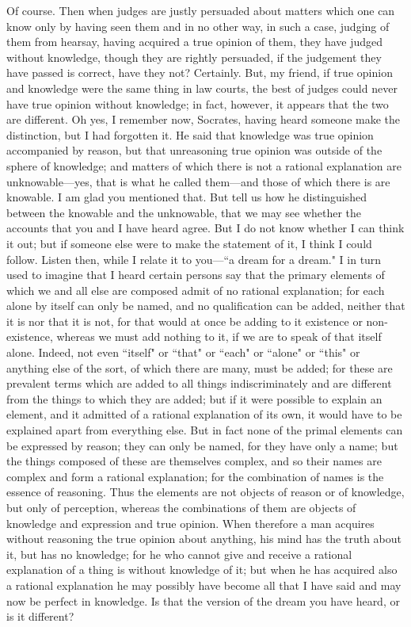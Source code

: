 \documentclass[letterpaper,12pt]{article}
\newcommand{\stephpag}[1]{\marginnote{\small\itshape\fontfamily{ppl}\selectfont #1}}
\begin{document}
\begin{drama}
\theaetetusspeaks
Of course.
\socratesspeaks
Then when judges are justly persuaded about matters which one can know only by having seen them and in no other way, in such a case, judging of them from hearsay, having acquired a true opinion of them, \stephpag{c} they have judged without knowledge, though they are rightly persuaded, if the judgement they have passed is correct, have they not?
\theaetetusspeaks
Certainly.
\socratesspeaks
But, my friend, if true opinion and knowledge were the same thing in law courts, the best of judges could never have true opinion without knowledge; in fact, however, it appears that the two are different.
\theaetetusspeaks
Oh yes, I remember now, Socrates, having heard someone make the distinction, but I had forgotten it. He said that knowledge was true opinion accompanied by reason, \stephpag{d} but that unreasoning true opinion was outside of the sphere of knowledge; and matters of which there is not a rational explanation are unknowable—yes, that is what he called them—and those of which there is are knowable.
\socratesspeaks
I am glad you mentioned that. But tell us how he distinguished between the knowable and the unknowable, that we may see whether the accounts that you and I have heard agree.
\theaetetusspeaks
But I do not know whether I can think it out; but if someone else were to make the statement of it, I think I could follow.
\socratesspeaks
Listen then, while I relate it to you—``a dream for a dream." I in turn \stephpag{e} used to imagine that I heard certain persons say that the primary elements of which we and all else are composed admit of no rational explanation; for each alone by itself can only be named, and no qualification can be added, neither that it is nor that it is not, \stephpag{202 a} for that would at once be adding to it existence or non-existence, whereas we must add nothing to it, if we are to speak of that itself alone. Indeed, not even ``itself" or ``that" or ``each" or ``alone" or ``this" or anything else of the sort, of which there are many, must be added; for these are prevalent terms which are added to all things indiscriminately and are different from the things to which they are added; but if it were possible to explain an element, and it admitted of a rational explanation of its own, it would have to be explained apart from everything else. But in fact none of the primal elements can be expressed by reason; \stephpag{b} they can only be named, for they have only a name; but the things composed of these are themselves complex, and so their names are complex and form a rational explanation; for the combination of names is the essence of reasoning. Thus the elements are not objects of reason or of knowledge, but only of perception, whereas the combinations of them are objects of knowledge and expression and true opinion. When therefore a man acquires without reasoning the true opinion about anything, \stephpag{c} his mind has the truth about it, but has no knowledge; for he who cannot give and receive a rational explanation of a thing is without knowledge of it; but when he has acquired also a rational explanation he may possibly have become all that I have said and may now be perfect in knowledge. Is that the version of the dream you have heard, or is it different?

\end{drama}
\end{document}
